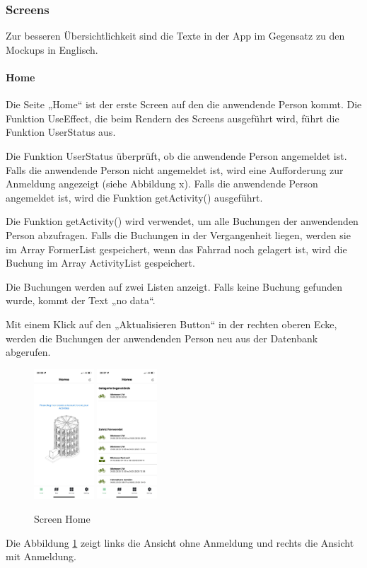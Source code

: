 \subsubsection{Screens}Zur besseren Übersichtlichkeit sind die Texte in der App im Gegensatz zu den Mockups in Englisch.

\paragraph{Home}Die Seite „Home“ ist der erste Screen auf den die anwendende Person kommt. Die Funktion UseEffect, die beim Rendern des Screens ausgeführt wird, führt die Funktion UserStatus aus.

\noindent Die Funktion UserStatus überprüft, ob die anwendende Person angemeldet ist. Falls die anwendende Person nicht angemeldet ist, wird eine Aufforderung zur Anmeldung angezeigt (siehe Abbildung x). Falls die anwendende Person angemeldet ist, wird die Funktion getActivity() ausgeführt.

\noindent Die Funktion getActivity() wird verwendet, um alle Buchungen der anwendenden Person abzufragen. Falls die Buchungen in der Vergangenheit liegen, werden sie im \Gls{Array} FormerList gespeichert, wenn das Fahrrad noch gelagert ist, wird die Buchung im \Gls{Array} ActivityList gespeichert.

\noindent Die Buchungen werden auf zwei Listen anzeigt. Falls keine Buchung gefunden wurde, kommt der Text „no data“.

\noindent Mit einem Klick auf den „Aktualisieren Button“ in der rechten oberen Ecke, werden die Buchungen der anwendenden Person neu aus der Datenbank abgerufen.


\begin{figure}[H]
  \centering
  \includegraphics[width=0.2\textwidth]{images/app-screenshots/screenhomeno.png}
  \includegraphics[width=0.2\textwidth]{images/app-screenshots/screenhomeyes.png}
  \caption{Screen Home}
  \label{fig:screenhome}
\end{figure}
Die Abbildung \ref{fig:screenhome} zeigt links die Ansicht ohne Anmeldung und rechts die Ansicht mit Anmeldung.

